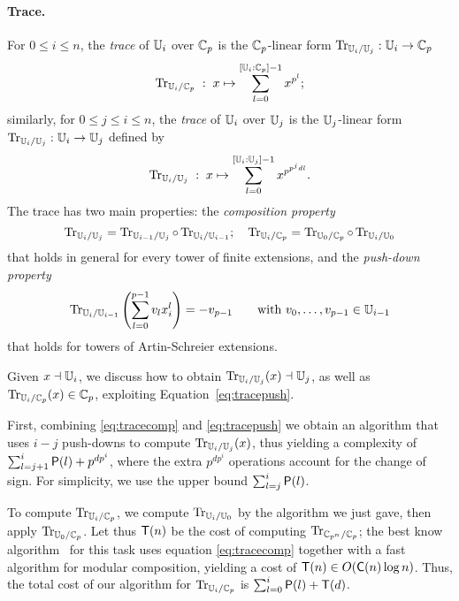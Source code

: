 \paragraph{Trace.}
For $0 \le i \le n$, the {\em trace} of $\mathbb{U}_i$ over $\mathbb{C}_p$ is the
$\mathbb{C}_p$-linear form ${\operatorname{Tr}_{\mathbb{U}_i/\mathbb{U}_j} : \mathbb{U}_i \rightarrow \mathbb{C}_p}$
\begin{equation}
  \label{eq:tracec0}
  \operatorname{Tr}_{\mathbb{U}_i/\mathbb{C}_p}  \;:\; x \mapsto \sum_{l=0}^{[\mathbb{U}_i:\mathbb{C}_p] - 1}x^{p^l};
\end{equation}
similarly, for $0 \le j \le i \le n$, the {\em trace} of $\mathbb{U}_i$ over
$\mathbb{U}_j$ is the $\mathbb{U}_j$-linear form $\operatorname{Tr}_{\mathbb{U}_i/\mathbb{U}_j} : \mathbb{U}_i \rightarrow
\mathbb{U}_j$ defined by
\[\operatorname{Tr}_{\mathbb{U}_i/\mathbb{U}_j} \;:\; x \mapsto \sum_{l=0}^{[\mathbb{U}_i:\mathbb{U}_j] - 1}x^{p^{p^jdl}}.\]
The trace has two main properties: the \emph{composition property}
\begin{equation}
  \label{eq:tracecomp}
  \operatorname{Tr}_{\mathbb{U}_i/\mathbb{U}_j} = 
  \operatorname{Tr}_{\mathbb{U}_{i-1}/\mathbb{U}_j} \circ \operatorname{Tr}_{\mathbb{U}_i/\mathbb{U}_{i-1}};\quad
\operatorname{Tr}_{\mathbb{U}_i/\mathbb{C}_p} = \operatorname{Tr}_{\mathbb{U}_0/\mathbb{C}_p} \circ \operatorname{Tr}_{\mathbb{U}_i/\mathbb{U}_0}
\end{equation}
that holds in general for every tower of finite extensions, and the
\emph{push-down property}
\begin{equation}
  \label{eq:tracepush}
  \operatorname{Tr}_{\mathbb{U}_i/\mathbb{U}_{i-1}}\left(\sum_{l=0}^{p-1}v_lx_i^l\right) = -v_{p-1} 
  \qquad
  \text{with } v_0,\ldots,v_{p-1}\in\mathbb{U}_{i-1}
\end{equation}
that holds for towers of Artin-Schreier extensions. 

Given $x \dashv \mathbb{U}_i$, we discuss how to obtain $\operatorname{Tr}_{\mathbb{U}_i/\mathbb{U}_j}(x) \dashv
\mathbb{U}_j$, as well as $\operatorname{Tr}_{\mathbb{U}_i/\mathbb{C}_p}(x) \in \mathbb{C}_p$, exploiting
Equation~\eqref{eq:tracepush}.

First, combining \eqref{eq:tracecomp} and \eqref{eq:tracepush} we
obtain an algorithm that uses $i-j$ push-downs to compute
$\operatorname{Tr}_{\mathbb{U}_i/\mathbb{U}_j}(x)$, thus yielding a complexity of
$\sum_{l=j+1}^i\mathrm{\sf P}(l)+p^{dp^i}$, where the extra $p^{dp^i}$
operations account for the change of sign. For simplicity, we use the
upper bound $\sum_{l=j}^i\mathrm{\sf P}(l)$.

To compute $\operatorname{Tr}_{\mathbb{U}_i/\mathbb{C}_p}$, we compute $\operatorname{Tr}_{\mathbb{U}_i/\mathbb{U}_0}$ by the
algorithm we just gave, then apply $\operatorname{Tr}_{\mathbb{U}_0/\mathbb{C}_p}$.  Let thus
$\mathrm{\sf T}(n)$ be the cost of computing $\operatorname{Tr}_{\mathbb{C}_{p^n}/\mathbb{C}_p}$; the best
know algorithm~\cite{GaShXX} for this task uses equation
\eqref{eq:tracecomp} together with a fast algorithm for modular
composition, yielding a cost of $\mathrm{\sf T}(n) \in O(\mathrm{\sf C}(n)\log
n)$. Thus, the total cost of our algorithm for $\operatorname{Tr}_{\mathbb{U}_i/\mathbb{C}_p}$ is
$\sum_{l=0}^i\mathrm{\sf P}(l) + \mathrm{\sf T}(d)$.

